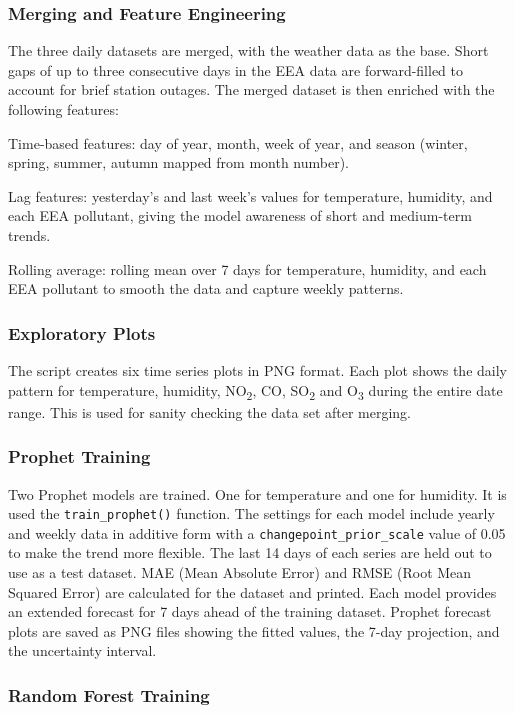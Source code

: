 \subsubsection{Merging and Feature Engineering}

The three daily datasets are merged, with the weather data as the base. Short gaps of up to
three consecutive days in the EEA data are forward-filled to account for brief station outages.
The merged dataset is then enriched with the following features:

Time-based features: day of year, month, week of year, and season (winter, spring, summer,
autumn mapped from month number).

Lag features: yesterday's and last week's values for temperature, humidity, and each EEA
pollutant, giving the model awareness of short and medium-term trends.

Rolling average: rolling mean over 7 days for temperature, humidity, and each EEA pollutant to
smooth the data and capture weekly patterns.

\subsubsection{Exploratory Plots}

The script creates six time series plots in PNG format. Each plot shows the daily pattern for
temperature, humidity, NO\textsubscript{2}, CO, SO\textsubscript{2} and O\textsubscript{3}
during the entire date range. This is used for sanity checking the data set after merging.

\subsubsection{Prophet Training}

Two Prophet models are trained. One for temperature and one for humidity. It is used the
\texttt{train\_prophet()} function. The settings for each model include yearly and weekly data
in additive form with a \texttt{changepoint\_prior\_scale} value of 0.05 to make the trend
more flexible. The last 14 days of each series are held out to use as a test dataset. MAE
(Mean Absolute Error) and RMSE (Root Mean Squared Error) are calculated for the dataset and
printed. Each model provides an extended forecast for 7 days ahead of the training dataset.
Prophet forecast plots are saved as PNG files showing the fitted values, the 7-day projection,
and the uncertainty interval.

\subsubsection{Random Forest Training}

